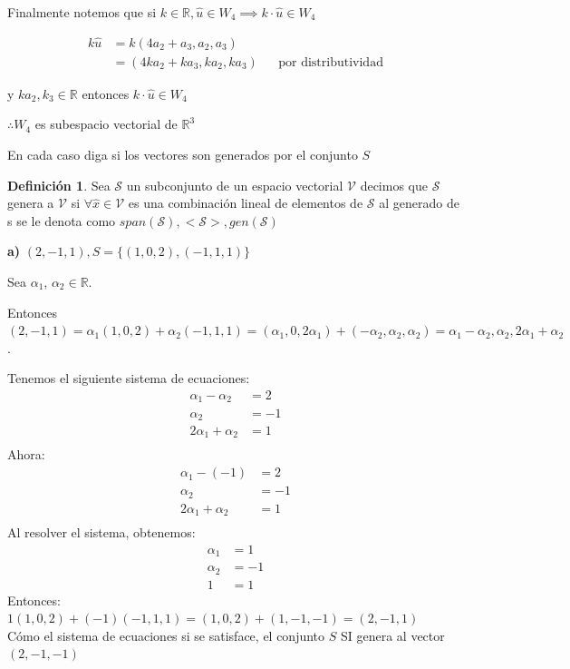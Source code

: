 \documentclass[letterpaper]{article}
\newcommand{\R}{\mathds{R}}
\renewcommand{\*}{\cdot}
\theoremstyle{definition}
\newtheorem{definition}{Definición}
\begin{document}
Finalmente notemos que si $ k \in \R, \hat{u} \in W_4 \implies k\* \hat{u} \in W_4 $ 

\begin{align*}
	k\hat{u} & = k(4a_2 + a_3, a_2, a_3)\\
	 & = (4ka_2 + ka_3, ka_2, ka_3) && \text{por distributividad}
\end{align*}

y $ ka_2, k_3 \in \R $ entonces $ k\*\hat{u} \in W_4 $
\begin{center}
	$ \therefore W_4 $ es subespacio vectorial de $ \R^3 $
\end{center}


\begin{ejercicio}{6}
	En cada caso diga si los vectores son generados por el conjunto $S$
\end{ejercicio}

\begin{definition}
	Sea $ \mathcal{S} $ un subconjunto de un espacio vectorial $ \mathcal{V} $ decimos que $ \mathcal{S} $ genera a $ \mathcal{V} $ si $ \forall \hat{x} \in \mathcal{V} $ es una combinación lineal de elementos de $ \mathcal{S} $ al generado de s se le denota como $ span(\mathcal{S}), <\mathcal{S}>, gen(\mathcal{S})$ 
\end{definition}

\textbf{a)} $(2,-1,1), S =  \lbrace (1,0,2),(-1,1,1) \rbrace$

Sea $\alpha _1$, $\alpha _2 \in \mathbb{R}$.

Entonces $(2,-1,1) = \alpha _{1}(1,0,2) + \alpha _{2}(-1,1,1) = (\alpha _{1}, 0, 2\alpha _{1})+ (-\alpha _{2},\alpha _{2},\alpha _{2}) = \alpha _{1}-\alpha _{2},\alpha _{2},2\alpha _{1}+\alpha _{2}$.

Tenemos el siguiente sistema de ecuaciones:
	\begin{align*}
		\alpha_{1}-\alpha_{2}&= 2 \\
		\alpha_{2} &= -1\\
		2\alpha_{1}+\alpha_{2}&=1\\
	\end{align*}
	Ahora:
	\begin{align*}
		\alpha_{1} -(-1)&=2 \\
		\alpha_{2}&=-1\\
		2\alpha_{1} + \alpha_{2} &= 1\\
	\end{align*}
Al resolver el sistema, obtenemos:
	\begin{align*}
		\alpha_{1}&=1 \\
		\alpha_{2} &= -1 \\
		1 &= 1
	\end{align*}
Entonces:\\ $1(1,0,2) + (-1)(-1,1,1) = (1,0,2) + (1,-1,-1) = (2,-1,1)$\\
Cómo el sistema de ecuaciones si se satisface, el conjunto $S$ SI genera al vector $(2,-1,-1)$\\ \\
\end{document}
